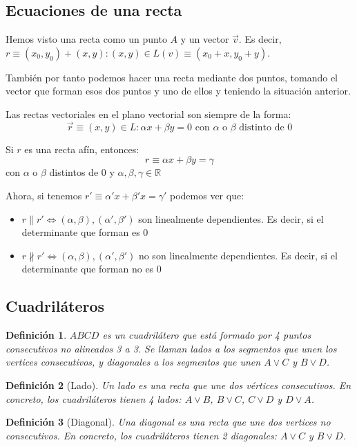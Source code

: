 \documentclass[11pt, a4paper, titlepage]{article}
\newcommand{\R}{\mathbb{R}}
\theoremstyle{theorem-style}
\theoremstyle{definition-style}
\newtheorem*{ndef}{Definición}
\theoremstyle{remark-style}
\theoremstyle{example-style}
\begin{document}
\subsection{Ecuaciones de una recta}
Hemos visto una recta como un punto $A$ y un vector $\vec{v}$. Es decir, $r \equiv (x_0,y_0) +(x,y) : (x,y) \in L(v) \equiv (x_0+x,y_0+y) $.

También por tanto podemos hacer una recta mediante dos puntos, tomando el vector que forman esos dos puntos y uno de ellos y teniendo la situación anterior.

Las rectas vectoriales en el plano vectorial son siempre de la forma:
\[
\vec{r} \equiv (x,y) \in L : \alpha x + \beta y = 0 \text{  con $\alpha$ o $\beta$ distinto de 0}
\]

Si $r$ es una recta afín, entonces:
\[
r \equiv \alpha x + \beta y = \gamma
\] con $\alpha$ o $\beta$ distintos de $0$ y $\alpha,\beta,\gamma \in \R$

Ahora, si tenemos $r'\equiv \alpha' x + \beta' x = \gamma '$ podemos ver que:
\begin{itemize}
	\item $r \parallel r' \iff (\alpha,\beta), (\alpha',\beta') $ son linealmente dependientes. Es decir, si el determinante que forman es $0$

	\item $r \nparallel r'\iff (\alpha,\beta), (\alpha',\beta') $ no son linealmente dependientes. Es decir, si el determinante que forman no es $0$
\end{itemize}

\subsection{Cuadriláteros}

\begin{ndef}
	$ABCD$ es un cuadrilátero que está formado por 4 puntos consecutivos no alineados 3 a 3. Se llaman lados a los segmentos que unen los vertices consecutivos, y diagonales a los segmentos que unen $A \vee C$ y $B \vee D$.
\end{ndef}

\begin{ndef}[Lado]
	Un lado es una recta que une dos vértices consecutivos. En concreto, los cuadriláteros tienen 4 lados: $A \vee B$, $B \vee C$, $C \vee D$
	y $D \vee A$.
\end{ndef}

\begin{ndef}[Diagonal]
	Una diagonal es una recta que une dos vertices no consecutivos. En concreto, los cuadriláteros tienen 2 diagonales: $A \vee C$ y $B \vee D$.
\end{ndef}
\end{document}
